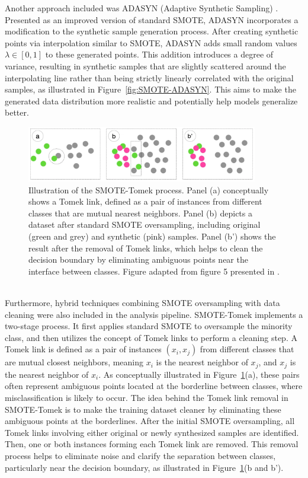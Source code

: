 \documentclass[12pt,a4paper]{report}
\begin{document}
\noindent
Another approach included was ADASYN (Adaptive Synthetic Sampling) \cite{He2008ADASYN}. Presented as an improved version of standard SMOTE, ADASYN incorporates a modification to the synthetic sample generation process. After creating synthetic points via interpolation similar to SMOTE, ADASYN adds small random values $\lambda \in [0, 1]$ to these generated points. This addition introduces a degree of variance, resulting in synthetic samples that are slightly scattered around the interpolating line rather than being strictly linearly correlated with the original samples, as illustrated in Figure~\ref{fig:SMOTE-ADASYN}. This aims to make the generated data distribution more realistic and potentially help models generalize better.\\
\begin{figure}[h!]
  \centering
  \includegraphics[width=0.9\textwidth]{images/SMOTE-Tomek.png}
  \caption[Illustration of SMOTE-Tomek Process]{Illustration of the SMOTE-Tomek process. Panel (a) conceptually shows a Tomek link, defined as a pair of instances from different classes that are mutual nearest neighbors. Panel (b) depicts a dataset after standard SMOTE oversampling, including original (green and grey) and synthetic (pink) samples. Panel (b') shows the result after the removal of Tomek links, which helps to clean the decision boundary by eliminating ambiguous points near the interface between classes. Figure adapted from figure 5 presented in \cite{Truong2022SMOTEVariants}.}
  \label{fig:SMOTE-Tomek} %
\end{figure}
\\
\noindent
Furthermore, hybrid techniques combining SMOTE oversampling with data cleaning were also included in the analysis pipeline. SMOTE-Tomek \cite{Batista2004Study} implements a two-stage process. It first applies standard SMOTE to oversample the minority class, and then utilizes the concept of Tomek links to perform a cleaning step. A Tomek link is defined as a pair of instances $(x_i, x_j)$ from different classes that are mutual closest neighbors, meaning $x_i$ is the nearest neighbor of $x_j$, and $x_j$ is the nearest neighbor of $x_i$. As conceptually illustrated in Figure~\ref{fig:SMOTE-Tomek}(a), these pairs often represent ambiguous points located at the borderline between classes, where misclassification is likely to occur. The idea behind the Tomek link removal in SMOTE-Tomek is to make the training dataset cleaner by eliminating these ambiguous points at the borderlines. After the initial SMOTE oversampling, all Tomek links involving either original or newly synthesized samples are identified. Then, one or both instances forming each Tomek link are removed. This removal process helps to eliminate noise and clarify the separation between classes, particularly near the decision boundary, as illustrated in Figure~\ref{fig:SMOTE-Tomek}(b and b').\\
\end{document}
